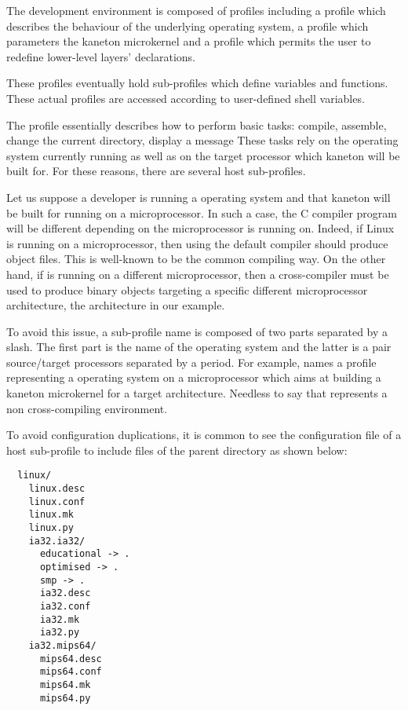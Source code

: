 The development environment is composed of profiles including a 
profile which describes the behaviour of the underlying operating system, a
 profile which parameters the kaneton microkernel and a
 profile which permits the user to redefine lower-level layers'
declarations.

These profiles eventually hold sub-profiles which define variables and
functions. These actual profiles are accessed according to user-defined
shell variables.



The  profile essentially describes how to perform basic tasks:
compile, assemble, change the current directory, display a message \etc{} These
tasks rely on the operating system currently running as well as on the target
processor which kaneton will be built for. For these reasons, there are
several host sub-profiles.

Let us suppose a developer is running a  operating system and
that kaneton will be built for running on a  microprocessor. In
such a case, the C compiler program will be different depending on the
microprocessor  is running on. Indeed, if Linux is running on
a  microprocessor, then using the default compiler should
produce  object files. This is well-known to be the common
compiling way. On the other hand, if  is running on a
different microprocessor, then a cross-compiler must be used to produce
binary objects targeting a specific different microprocessor architecture,
the  architecture in our example.

To avoid this issue, a  sub-profile name is composed of two parts
separated by a slash. The first part is the name of the operating system and
the latter is a pair source/target processors separated by a period. For
example,  names a  profile representing a
 operating system on a  microprocessor
which aims at building a kaneton microkernel for a 
target architecture. Needless to say that  represents
a non cross-compiling environment.

To avoid configuration duplications, it is common to see the configuration
file of a host sub-profile to include files of the parent directory as
shown below:

\begin{verbatim}
  linux/
    linux.desc
    linux.conf
    linux.mk
    linux.py
    ia32.ia32/
      educational -> .
      optimised -> .
      smp -> .
      ia32.desc
      ia32.conf
      ia32.mk
      ia32.py
    ia32.mips64/
      mips64.desc
      mips64.conf
      mips64.mk
      mips64.py
\end{verbatim}

